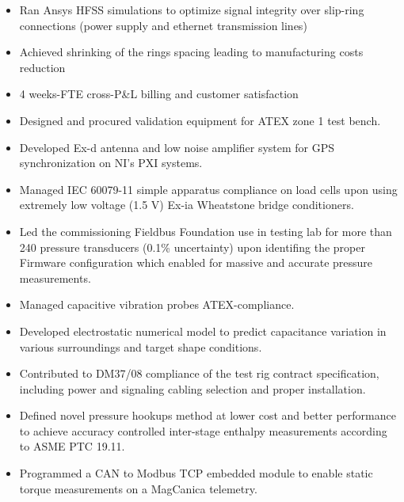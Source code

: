 \documentclass[9pt,a4paper,ragged2e,withhyper]{altacv} %
\begin{document}
\begin{paracol}{2}
\begin{itemize}
\item Ran Ansys HFSS simulations to optimize signal integrity over slip-ring connections
(power supply and ethernet transmission lines) 
\item Achieved shrinking of the rings spacing leading to manufacturing costs reduction
\item 4 weeks-FTE cross-P\&L billing and customer satisfaction
\end{itemize}
\divider

\begin{itemize}
\item Designed and procured validation equipment for ATEX zone 1 test bench. 
\item Developed Ex-d antenna and low noise amplifier system for GPS synchronization on NI's PXI systems. 
\item Managed IEC 60079-11 simple apparatus compliance on load cells upon using
extremely low voltage (1.5 V) Ex-ia Wheatstone bridge conditioners.
\end{itemize}
\divider

\begin{itemize}
\item Led the commissioning Fieldbus Foundation use in testing lab for more than 240 pressure transducers (0.1\% uncertainty) 
upon identifing the proper Firmware configuration which enabled for massive and accurate pressure measurements.
\item Managed capacitive vibration probes ATEX-compliance. 
\item Developed electrostatic numerical model to predict capacitance variation in various surroundings and target shape conditions. 
\item Contributed to DM37/08 compliance of the test rig contract specification, including power and signaling cabling selection and proper installation.
\end{itemize}
\divider

\begin{itemize}
\item Defined novel pressure hookups method at lower cost and better performance to achieve accuracy controlled inter-stage enthalpy measurements 
according to ASME PTC 19.11. 
\item Programmed a CAN to Modbus TCP embedded module to enable static torque measurements on a MagCanica telemetry.
\end{itemize}
\divider


\end{paracol}
\end{document}
